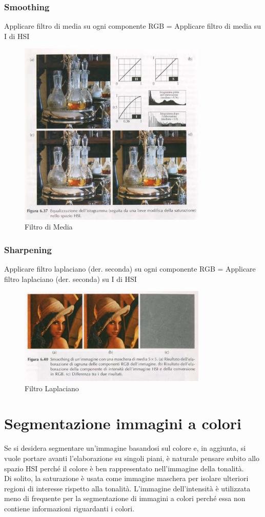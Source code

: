\documentclass[12pt]{article}
\begin{document}
\subsubsection{Smoothing}
Applicare filtro di media su ogni componente RGB = Applicare filtro di media su I di HSI
\begin{figure}[!htb]
    \centering
    \includegraphics[width=0.8\textwidth]{Images/istcol.png}
    \caption{Filtro di Media}
\end{figure}
\FloatBarrier
\subsubsection{Sharpening}
Applicare filtro laplaciano (der. seconda) su ogni componente RGB = Applicare filtro laplaciano (der. seconda) su I di HSI
\begin{figure}[!htb]
    \centering
    \includegraphics[width=0.8\textwidth]{Images/lapcol.png}
    \caption{Filtro Laplaciano}
\end{figure}
\FloatBarrier
\newpage
\section{Segmentazione immagini a colori}
Se si desidera segmentare un'immagine basandosi sul colore e, in aggiunta, si vuole portare avanti l'elaborazione su singoli piani, è naturale pensare subito allo spazio HSI perché il colore è ben rappresentato nell'immagine della tonalità.\\
Di solito, la saturazione è usata come immagine maschera per isolare ulteriori regioni di interesse rispetto alla tonalità. L'immagine dell'intensità è utilizzata meno di frequente per la segmentazione di
immagini a colori perché essa non contiene informazioni riguardanti i colori.
\end{document}
